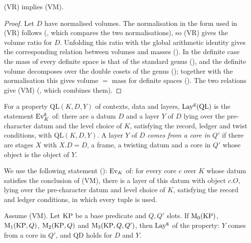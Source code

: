 \begin{lemma}\label{pf:stageU:volmass}
\textup{(VR)} implies \textup{(VM)}.
\end{lemma}

\begin{proof}
Let $D$ have normalised volumes. The normalisation in the form used in (VR) follows
(, which compares the two normalisations), so (VR) gives the volume ratio
for $D$. Unfolding this ratio with the global arithmetic identity gives the corresponding relation between volumes and
masses (). In the definite case the mass of every
definite space is that of the standard genus (), and the definite volume
decomposes over the double cosets of the genus (); together
with the normalisation this gives volume $=$ mass for definite spaces
(). The two relations
give (VM) (, which combines them).
\end{proof}

\begin{definition}\label{pf:stageU:recatgdef}
For a property $\mathrm{QL}(K,D,Y)$ of contexts, data and layers, $\mathrm{Lay}^{\mathrm g}(\mathrm{QL})$ is the statement
$\mathrm{Ev}^{\mathrm g}_K$ of: there are a datum $D$ and a layer $Y$ of $D$ lying over the pre-character datum and the level
choice of $K$, satisfying the record, ledger and twist conditions, with $\mathrm{QL}(K,D,Y)$. A layer $Y$ of $D$ \emph{comes
from a core in} $Q'$ if there are stages $X$ with $X.D=D$, a frame, a twisting datum and a core in $Q'$ whose object is the
object of $Y$.
\end{definition}

We use the following statement (): $\mathrm{Ev}_K$ of: for every core
$c$ over $K$ whose datum satisfies the conclusion of (VM), there is a layer of this datum with object $c.O$, lying over the
pre-character datum and level choice of $K$, satisfying the record and ledger conditions, in which every tuple is used.

\begin{lemma}\label{pf:stageU:recatg}
Assume \textup{(VM)}. Let $\mathrm{KP}$ be a base predicate and $Q,Q'$ slots. If $\mathrm{M}_0(\mathrm{KP})$, $\mathrm{M}_1(\mathrm{KP},Q)$,
$\mathrm{M}_2(\mathrm{KP},Q)$ and $\mathrm{M}_3(\mathrm{KP},Q,Q')$, then $\mathrm{Lay}^{\mathrm g}$ of the property: $Y$ comes from a core
in $Q'$, and $\mathrm{QD}$ holds for $D$ and $Y$.
\end{lemma}

